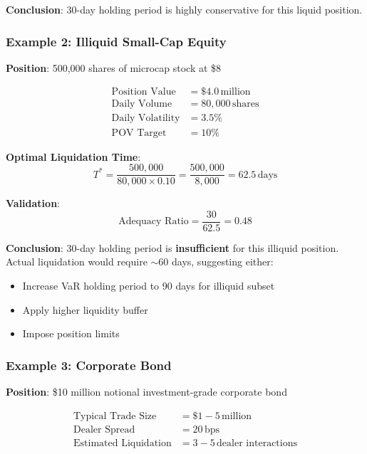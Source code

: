 \documentclass[11pt,a4paper]{article}
\begin{document}
\textbf{Conclusion}: 30-day holding period is highly conservative for this liquid position.

\subsubsection{Example 2: Illiquid Small-Cap Equity}

\textbf{Position}: 500,000 shares of microcap stock at \$8

\begin{align*}
\text{Position Value} &= \$4.0\,\text{million} \\
\text{Daily Volume} &= 80,000\,\text{shares} \\
\text{Daily Volatility} &= 3.5\% \\
\text{POV Target} &= 10\%
\end{align*}

\textbf{Optimal Liquidation Time}:
\begin{equation}
T^* = \frac{500,000}{80,000 \times 0.10} = \frac{500,000}{8,000} = 62.5\,\text{days}
\end{equation}

\textbf{Validation}:
\begin{equation}
\text{Adequacy Ratio} = \frac{30}{62.5} = 0.48
\end{equation}

\textbf{Conclusion}: 30-day holding period is \textbf{insufficient} for this illiquid position. Actual liquidation would require $\sim$60 days, suggesting either:
\begin{itemize}
    \item Increase VaR holding period to 90 days for illiquid subset
    \item Apply higher liquidity buffer
    \item Impose position limits
\end{itemize}

\subsubsection{Example 3: Corporate Bond}

\textbf{Position}: \$10 million notional investment-grade corporate bond

\begin{align*}
\text{Typical Trade Size} &= \$1-5\,\text{million} \\
\text{Dealer Spread} &= 20\,\text{bps} \\
\text{Estimated Liquidation} &= 3-5\,\text{dealer interactions}
\end{align*}
\end{document}

